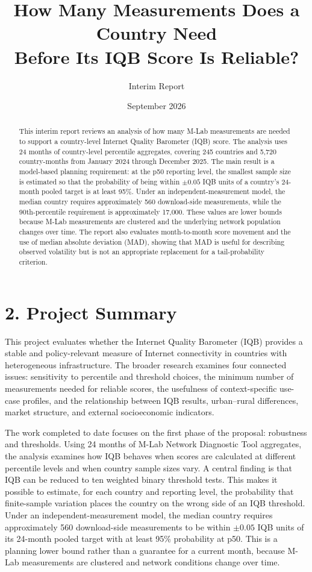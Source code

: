 \documentclass[11pt]{article}
\title{How Many Measurements Does a Country Need\\Before Its IQB Score Is Reliable?}
\author{Interim Report}
\date{September 2026}
\begin{document}
\maketitle

\begin{abstract}
This interim report reviews an analysis of how many M-Lab measurements are needed to support a
country-level Internet Quality Barometer (IQB) score. The analysis uses 24 months of country-level
percentile aggregates, covering 245 countries and 5,720 country-months from January 2024 through
December 2025. The main result is a model-based planning requirement: at the p50 reporting level,
the smallest sample size is estimated so that the probability of being within $\pm 0.05$ IQB units
of a country's 24-month pooled target is at least 95\%. Under an independent-measurement model,
the median country requires approximately 560 download-side measurements, while the 90th-percentile
requirement is approximately 17,000. These values are lower bounds because M-Lab measurements are
clustered and the underlying network population changes over time. The report also evaluates
month-to-month score movement and the use of median absolute deviation (MAD), showing that MAD is
useful for describing observed volatility but is not an appropriate replacement for a tail-probability
criterion.
\end{abstract}

\section*{2. Project Summary}

This project evaluates whether the Internet Quality Barometer (IQB) provides a stable and policy-relevant
measure of Internet connectivity in countries with heterogeneous infrastructure. The broader research
examines four connected issues: sensitivity to percentile and threshold choices, the minimum number of
measurements needed for reliable scores, the usefulness of context-specific use-case profiles, and the
relationship between IQB results, urban--rural differences, market structure, and external socioeconomic
indicators.

The work completed to date focuses on the first phase of the proposal: robustness and thresholds. Using
24 months of M-Lab Network Diagnostic Tool aggregates, the analysis examines how IQB behaves when scores
are calculated at different percentile levels and when country sample sizes vary. A central finding is
that IQB can be reduced to ten weighted binary threshold tests. This makes it possible to estimate, for
each country and reporting level, the probability that finite-sample variation places the country on the
wrong side of an IQB threshold. Under an independent-measurement model, the median country requires
approximately 560 download-side measurements to be within $\pm0.05$ IQB units of its 24-month pooled
target with at least 95\% probability at p50. This is a planning lower bound rather than a guarantee for
a current month, because M-Lab measurements are clustered and network conditions change over time.
\end{document}
